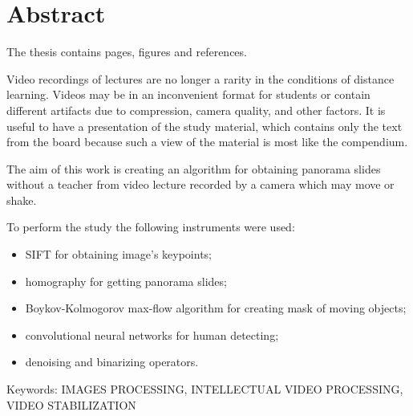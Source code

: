 \chapter*{Abstract}

The thesis contains
\pageref{LastPage}
pages,
figures
and
 references.

Video recordings of lectures are no longer a rarity in
the conditions of distance learning.
Videos may be in an inconvenient format for
students or contain different artifacts due
to compression, camera quality, and other factors.
It is useful to have a presentation of the study material,
which contains only the text from the board
because such a view of the material is most
like the compendium.

The aim of this work
is creating an algorithm for obtaining panorama
slides without a teacher from video lecture
recorded by a camera which may move or shake.

To perform the study the following instruments were used:
\begin{itemize}
      \item
            SIFT for obtaining image's keypoints;
      \item
            homography for getting panorama slides;
      \item
            Boykov-Kolmogorov max-flow algorithm for creating mask of
            moving objects;
      \item
            convolutional neural networks for human detecting;
      \item
            denoising and binarizing operators.
\end{itemize}

Keywords:
\MakeUppercase{images processing, intellectual video
      processing, video stabilization}

